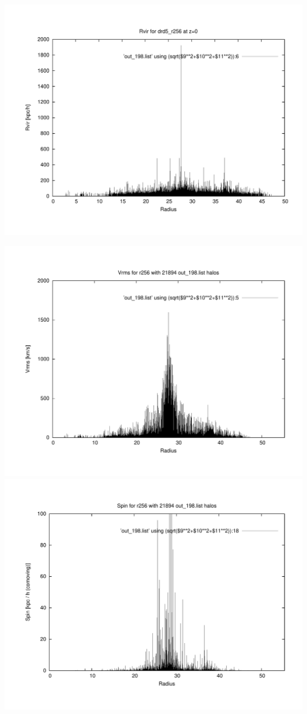 \includegraphics[scale=0.3]{r256/h100/drd5_r256/plot_rvir_z0.pdf}

\includegraphics[scale=0.3]{r256/h100/drd5_r256/plot_Vrms_out_198.pdf}
\includegraphics[scale=0.3]{r256/h100/drd5_r256/plot_spin_out_198.pdf}

